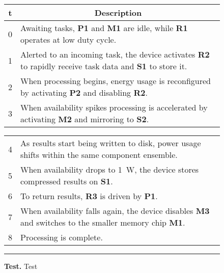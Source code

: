 \begin{figure*}
\noindent\begin{minipage}[t]{0.5\textwidth}
\vspace{0pt}
\begin{tabularx}{\columnwidth}{cX}

\textbf{t} &
\multicolumn{1}{c}{\textbf{Description}}
\\ \toprule 

0 & Awaiting tasks, \textbf{P1} and \textbf{M1} are idle, while
\textbf{R1} operates at low duty cycle.
\\

1 & 
Alerted to an incoming task, the device activates \textbf{R2} to rapidly
receive task data and \textbf{S1} to store it.
\\

2 &
When processing begins, energy usage is reconfigured by activating
\textbf{P2} and disabling \textbf{R2}.
\\

3 &
When availability spikes processing is accelerated by activating \textbf{M2}
and mirroring to \textbf{S2}.
\\

\end{tabularx}

\end{minipage}
\begin{minipage}[t]{0.5\textwidth}
\vspace{0pt}

\begin{tabularx}{\columnwidth}{cX}

& \\ \toprule 

4 &
As results start being written to disk, power usage shifts within the same
component ensemble.
\\

5 & 
When availability drops to 1~W, the device stores compressed results on
\textbf{S1}.
\\

6 &
To return results, \textbf{R3} is driven by \textbf{P1}.
\\

7 &
When availability falls again, the device disables \textbf{M3} and
switches to the smaller memory chip \textbf{M1}.
\\

8 &
Processing is complete.
\\

\end{tabularx}
\end{minipage}
\caption{\small \textbf{Test.} Test}
\label{table-transitions}
\vspace{0.10in}
\hrule
\vspace{-0.20in}
\end{figure*}
